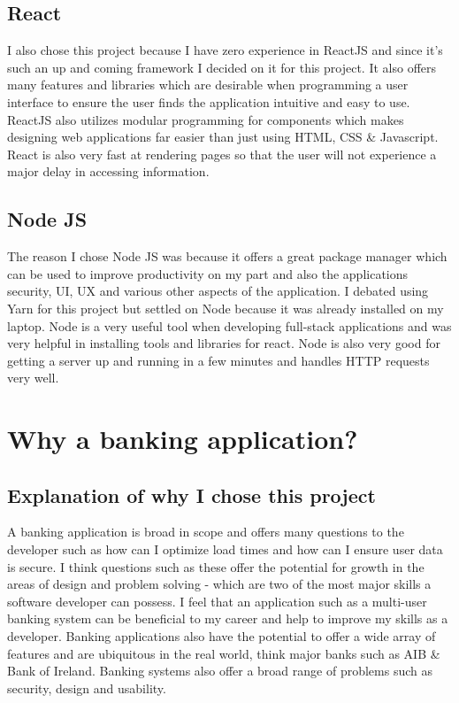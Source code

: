 \subsection{React}
I also chose this project because I have zero experience in ReactJS and since
it's such an up and coming framework I decided on it for this project. It also
offers many features and libraries which are desirable when programming a user
interface to ensure the user finds the application intuitive and easy to use.
ReactJS also utilizes modular programming for components which makes designing
web applications far easier than just using HTML, CSS \& Javascript. React is
also very fast at rendering pages so that the user will not experience a major
delay in accessing information.
\\
\subsection{Node JS}
The reason I chose Node JS was because it offers a great package manager which can be
used to improve productivity on my part and also the applications security, UI,
UX and various other aspects of the application.  I debated using Yarn for this
project but settled on Node because it was already installed on my laptop.  Node
is a very useful tool when developing full-stack applications and was very helpful
in installing tools and libraries for react.  Node is also very good for getting a server
up and running in a few minutes and handles HTTP requests very well.
\section{Why a banking application?}
\subsection{Explanation of why I chose this project}
A banking application is broad in scope and offers many questions to the developer
such as how can I optimize load times and how can I ensure user data is secure.
I think questions such as these offer the potential for growth in the areas of
design and problem solving - which are two of the most major skills a software
developer can possess. I feel that an application such as a multi-user banking
system can be beneficial to my career and help to improve my skills as a developer.
Banking applications also have the potential to offer a wide array of features and
are ubiquitous in the real world, think major banks such as AIB \& Bank of Ireland.
Banking systems also offer a broad range of problems such as security, design
and usability.
\\
